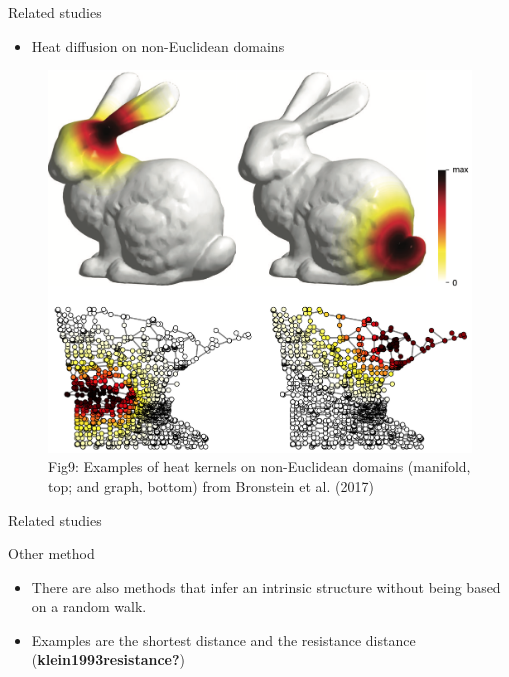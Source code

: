 \documentclass[
  ignorenonframetext,
]{beamer}
\providecommand{\tightlist}{%
  \setlength{\itemsep}{0pt}\setlength{\parskip}{0pt}}\usepackage{longtable,booktabs,array}
\begin{document}
\begin{frame}{Related studies}
\label{related-studies-7}
\begin{itemize}
\tightlist
\item
  Heat diffusion on non-Euclidean domains
\end{itemize}

\begin{figure}[H]

{\centering \includegraphics{Beamer_files/figure-beamer/ac3d5964-07e8-4bac-9d27-53a787729469-1-ddbd0c7d-ac06-4c45-bcda-1eecbd716cd3.png}

}

\caption{Fig9: Examples of heat kernels on non-Euclidean domains
(manifold, top; and graph, bottom) from Bronstein et al. (2017)}

\end{figure}%
\end{frame}

\begin{frame}{Related studies}
\label{related-studies-8}
\begin{block}{Other method}
\label{other-method}
\begin{itemize}
\tightlist
\item
  There are also methods that infer an intrinsic structure without being
  based on a random walk.
\item
  Examples are the shortest distance and the resistance distance
  (\textbf{klein1993resistance?})
\end{itemize}
\end{block}
\end{frame}
\end{document}
